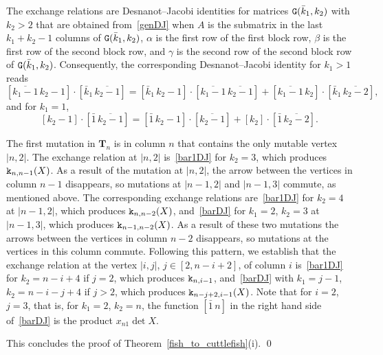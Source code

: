 \documentclass{amsart}
\theoremstyle{definition}
\theoremstyle{remark}
\numberwithin{equation}{section}
\numberwithin{theorem}{section}
\def\NG{{\tt G}}
\def\Ts{\mathbf T}
\def\ek{{\tt k}}
\begin{document}
The exchange relations
are Desnanot--Jacobi identities for matrices $\NG(\bar k_1,k_2)$ with $k_2>2$ that are obtained from~\eqref{genDJ} 
when $A$ is the submatrix in the last $k_1+k_2-1$ columns of $\NG(\bar k_1, k_{2})$,
$\alpha$ is the first row of the first block row, $\beta$ is the first row of the second block row, and $\gamma$ is the second row of the second block row of $\NG(\bar k_1,k_{2})$. Consequently, the corresponding Desnanot--Jacobi identity for $k_1>1$ reads
\begin{equation}\label{barDJ}
[\overline{k_1-1}\,k_2-1]\cdot[\bar k_1\,\overline{k_2-1}]=
[\bar k_1\,k_2-1]\cdot[\overline{k_1-1}\,\overline{k_2-1}]+[\overline{k_1-1}\,k_2]
\cdot[\bar k_1\,\overline{k_2-2}], 
\end{equation}
and for $k_1=1$,
\begin{equation}\label{bar1DJ}
[k_2-1]\cdot[\bar 1\,\overline{k_2-1}]=[\bar 1\,k_2-1]\cdot[\overline{k_2-1}]+[k_2]\cdot[\bar1\,\overline{k_2-2}]. 
\end{equation}

The first mutation in $\Ts_n$ is in column $n$ that contains the only mutable vertex $|n,2|$. The exchange relation at $|n,2|$ is~\eqref{bar1DJ} for $k_2=3$, which produces $\ek_{n,n-1}(X)$. As a result of the mutation at $|n,2|$, the arrow between the vertices in column $n-1$ disappears, so mutations at $|n-1,2|$ and $|n-1,3|$ commute, as mentioned above. 
The corresponding exchange relations are~\eqref{bar1DJ} for $k_2=4$ at $|n-1,2|$, which produces $\ek_{n,n-2}(X)$, 
and~\eqref{barDJ} for $k_1=2$, $k_2=3$ at $|n-1,3|$, which produces $\ek_{n-1,n-2}(X)$. As a result of these two mutations the arrows between the vertices in column $n-2$ disappears, so mutations at the vertices in this column commute. 
Following this pattern, we establish that the exchange relation at the vertex $|i,j|$, $j\in[2,n-i+2]$, of column $i$ 
is~\eqref{bar1DJ} for $k_2=n-i+4$ if $j=2$, which produces $\ek_{n,i-1}$, and~\eqref{barDJ} with $k_1=j-1$, $k_2=n-i-j+4$ if $j>2$, which produces $\ek_{n-j+2,i-1}(X)$. Note that for $i=2$, $j=3$, that is, for $k_1=2$, $k_2=n$, 
the function $[\bar1\, n]$ in the right hand side of~\eqref{barDJ} is the product $x_{n1}\det X$.

This concludes the proof of Theorem~\ref{fish_to_cuttlefish}(i). \qed
\end{document}
